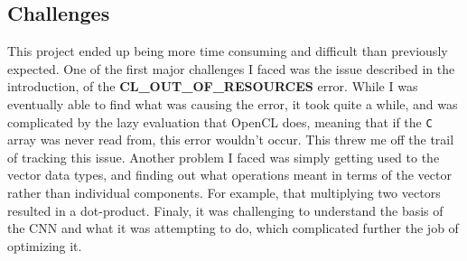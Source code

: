 \documentclass[letterpaper,twocolumn,10pt]{article}
\def\code#1{\texttt{#1}}
\begin{document}
\subsection{Challenges}
This project ended up being more time consuming and difficult than previously
expected. One of the first major challenges I faced was the issue described in
the introduction, of the \textbf{CL\_OUT\_OF\_RESOURCES} error. While I was
eventually able to find what was causing the error, it took quite a while, and
was complicated by the lazy evaluation that OpenCL does, meaning that if the
\code{C} array was never read from, this error wouldn't occur. This threw me
off the trail of tracking this issue. Another problem I faced was simply getting
used to the vector data types, and finding out what operations meant in terms
of the vector rather than individual components. For example, that multiplying
two vectors resulted in a dot-product. Finaly, it was challenging to understand
the basis of the CNN and what it was attempting to do, which complicated further
the job of optimizing it.
\end{document}
